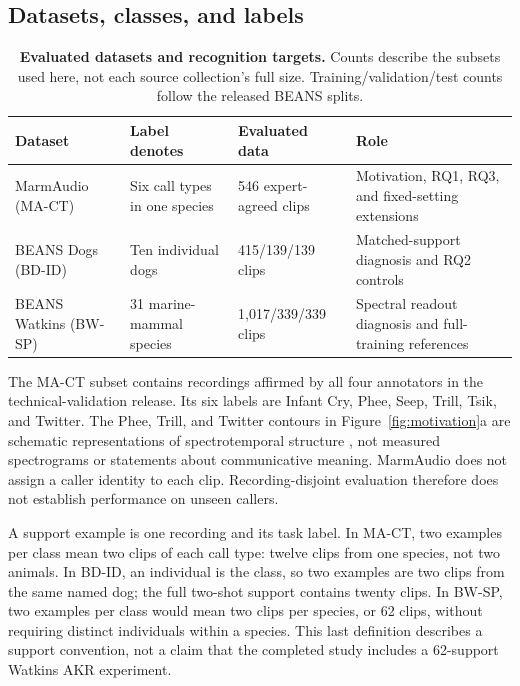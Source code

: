 \documentclass{article}
\begin{document}
\subsection{Datasets, classes, and labels}
\begin{table}[htbp]
\caption{\textbf{Evaluated datasets and recognition targets.} Counts describe the subsets used here, not each source collection's full size. Training/validation/test counts follow the released BEANS splits.}
\label{tab:datasets}
\centering\small
\begin{tabular}{@{}L{2.5cm}L{3.0cm}L{2.8cm}L{4.4cm}@{}}
\toprule
Dataset & Label denotes & Evaluated data & Role \\
\midrule
MarmAudio (MA-CT) \citep{lamothe2025marmaudio} & Six call types in one species & 546 expert-agreed clips & Motivation, RQ1, RQ3, and fixed-setting extensions \\
BEANS Dogs (BD-ID) \citep{hagiwara2022beans} & Ten individual dogs & 415/139/139 clips & Matched-support diagnosis and RQ2 controls \\
BEANS Watkins (BW-SP) \citep{hagiwara2022beans} & 31 marine-mammal species & 1,017/339/339 clips & Spectral readout diagnosis and full-training references \\
\bottomrule
\end{tabular}
\end{table}

The MA-CT subset contains recordings affirmed by all four annotators in the technical-validation release. Its six labels are Infant Cry, Phee, Seep, Trill, Tsik, and Twitter. The Phee, Trill, and Twitter contours in Figure~\ref{fig:motivation}a are schematic representations of spectrotemporal structure \citep{dimattina2006virtual,agamaite2015quantitative}, not measured spectrograms or statements about communicative meaning. MarmAudio does not assign a caller identity to each clip. Recording-disjoint evaluation therefore does not establish performance on unseen callers.

A support example is one recording and its task label. In MA-CT, two examples per class mean two clips of each call type: twelve clips from one species, not two animals. In BD-ID, an individual is the class, so two examples are two clips from the same named dog; the full two-shot support contains twenty clips. In BW-SP, two examples per class would mean two clips per species, or 62 clips, without requiring distinct individuals within a species. This last definition describes a support convention, not a claim that the completed study includes a 62-support Watkins AKR experiment.
\end{document}
